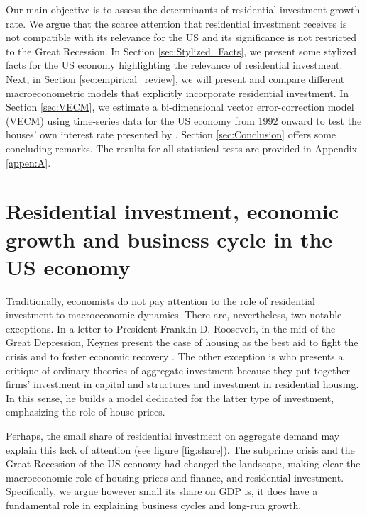 \documentclass[12pt, a4paper]{article}
\begin{document}
Our main objective is to assess the determinants of residential investment growth rate.
We argue that the scarce attention that residential investment receives is not compatible with its relevance for the US and its significance is not restricted to the Great Recession.
In Section \ref{sec:Stylized_Facts}, we present some stylized facts for the US economy highlighting the relevance of residential investment.
Next, in Section \ref{sec:empirical_review}, we will present and compare different macroeconometric models that explicitly incorporate residential investment.
In Section \ref{sec:VECM}, we estimate a bi-dimensional vector error-correction model (VECM) using time-series data for the US economy from 1992 onward to test the houses' own interest rate presented by \textcite{teixeira_crescimento_2015}. 
Section \ref{sec:Conclusion} offers some concluding remarks.
The results for all statistical tests are provided in Appendix \ref{appen:A}.



\section{Residential investment, economic growth and business cycle in the US economy}
\label{sec:orge9e9cce}
\label{sec:Stylized_Facts}
Traditionally, economists do not pay attention to the role of residential investment to macroeconomic dynamics.
There are, nevertheless, two notable exceptions.
In a letter to President Franklin D. Roosevelt, in the mid of the Great Depression, Keynes present the case of housing as the best aid to fight the crisis and to foster economic recovery \cite[p.~436]{keynes_collected_1978}.
The other exception is \textcite{duesenberry_investment_1958} who presents a critique of ordinary theories of aggregate investment because they put together firms’ investment in capital and structures and investment in residential housing.
In this sense, he builds a model dedicated for the latter type of investment, emphasizing the role of house prices.

Perhaps, the small share of residential investment on aggregate demand may explain this lack of attention (see figure \ref{fig:share}).
The subprime crisis and the Great Recession of the US economy had changed the landscape, making clear the macroeconomic role of
housing prices and finance, and residential investment.
Specifically, we argue however small its share on GDP is, it does have a fundamental role in explaining business cycles and long-run growth.
\end{document}
